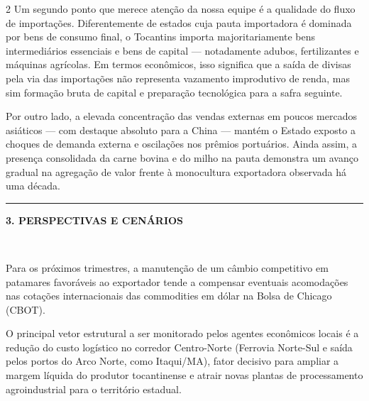 \documentclass[10pt,a4paper]{article}
\newcommand{\secaoperiodico}[1]{%
  \vspace{4pt}%
  \noindent\colorbox{corfundo}{%
    \parbox{\dimexpr\columnwidth-2\fboxsep\relax}{%
      \vspace{3pt}%
      \textcolor{douradoto}{\rule{4pt}{9pt}}\hspace{6pt}%
      \textcolor{corprimaria}{\textbf{\small \MakeUppercase{#1}}}%
      \vspace{2pt}%
    }%
  }\\[-2pt]%
  \noindent{\color{corprimaria}\rule{\columnwidth}{1pt}}%
  \vspace{3pt}\par%
}
\begin{document}
\begin{multicols}{2}
Um segundo ponto que merece atenção da nossa equipe é a qualidade do fluxo de importações. Diferentemente de estados cuja pauta importadora é dominada por bens de consumo final, o Tocantins importa majoritariamente bens intermediários essenciais e bens de capital — notadamente adubos, fertilizantes e máquinas agrícolas. Em termos econômicos, isso significa que a saída de divisas pela via das importações não representa vazamento improdutivo de renda, mas sim formação bruta de capital e preparação tecnológica para a safra seguinte.

\vspace{4pt}

Por outro lado, a elevada concentração das vendas externas em poucos mercados asiáticos — com destaque absoluto para a China — mantém o Estado exposto a choques de demanda externa e oscilações nos prêmios portuários. Ainda assim, a presença consolidada da carne bovina e do milho na pauta demonstra um avanço gradual na agregação de valor frente à monocultura exportadora observada há uma década.

\secaoperiodico{3. Perspectivas e Cenários}

Para os próximos trimestres, a manutenção de um câmbio competitivo em patamares favoráveis ao exportador tende a compensar eventuais acomodações nas cotações internacionais das commodities em dólar na Bolsa de Chicago (CBOT).

\vspace{4pt}

O principal vetor estrutural a ser monitorado pelos agentes econômicos locais é a redução do custo logístico no corredor Centro-Norte (Ferrovia Norte-Sul e saída pelos portos do Arco Norte, como Itaqui/MA), fator decisivo para ampliar a margem líquida do produtor tocantinense e atrair novas plantas de processamento agroindustrial para o território estadual.
\end{multicols}

\vspace{4pt}
\end{document}
